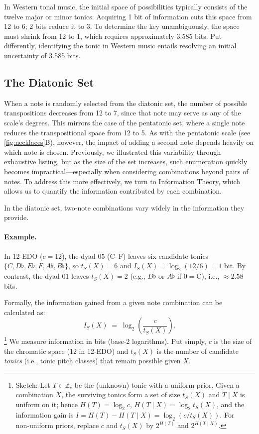 \documentclass[10pt,twocolumn]{article}
\numberwithin{equation}{section} %
\begin{document}
    In Western tonal music, the initial space of possibilities typically consists of the twelve major or minor tonics.
    Acquiring 1 bit of information cuts this space from 12 to 6; 2 bits reduce it to 3.
    To determine the key unambiguously, the space must shrink from 12 to 1, which requires approximately 3.585 bits.
    Put differently, identifying the tonic in Western music entails resolving an initial uncertainty of 3.585 bits.

    \subsection{The Diatonic Set}

    When a note is randomly selected from the diatonic set, the number of possible transpositions decreases from 12 to 7, since that note may serve as any of the scale's degrees.
    This mirrors the case of the pentatonic set, where a single note reduces the transpositional space from 12 to 5.
    As with the pentatonic scale (see \autoref{fig:necklaces}B), however, the impact of adding a second note depends heavily on which note is chosen.
    Previously, we illustrated this variability through exhaustive listing, but as the size of the set increases, such enumeration quickly becomes impractical—especially when considering combinations beyond pairs of notes.
    To address this more effectively, we turn to Information Theory, which allows us to quantify the information contributed by each combination.

    In the diatonic set, two‑note combinations vary widely in the information they provide.
    \paragraph{Example.}
    In 12‑EDO ($c=12$), the dyad 05 (C–F) leaves six candidate tonics
    $\{C,D\flat,E\flat,F,A\flat,B\flat\}$, so $t_S(X)=6$ and $I_S(X)=\log_2(12/6)=1$ bit.
    By contrast, the dyad 01 leaves $t_S(X)=2$ (e.g., $D\flat$ or $A\flat$ if $0{=}$C), i.e., $\approx 2.58$ bits.

    Formally, the information gained from a given note combination can be calculated as:
    \begin{equation}
        I_S(X) \;=\; \log_{2}\!\left(\frac{c}{t_S(X)}\right).
        \label{eq:derivingSelfInformation}
    \end{equation}
    \footnote{Sketch: Let $T\in\mathbb{Z}_c$ be the (unknown) tonic with a uniform prior. Given a combination $X$, the surviving tonics form a set of size $t_S(X)$ and $T\mid X$ is uniform on it; hence $H(T)=\log_2 c$, $H(T\mid X)=\log_2 t_S(X)$, and the information gain is $I=H(T)-H(T\mid X)=\log_2(c/t_S(X))$. For non‑uniform priors, replace $c$ and $t_S(X)$ by $2^{H(T)}$ and $2^{H(T\mid X)}$.}
    We measure information in bits (base‑2 logarithms). Put simply, $c$ is the size of the chromatic space (12 in 12‑EDO) and $t_S(X)$ is the number of candidate \emph{tonics} (i.e., tonic pitch classes) that remain possible given $X$.
\end{document}
